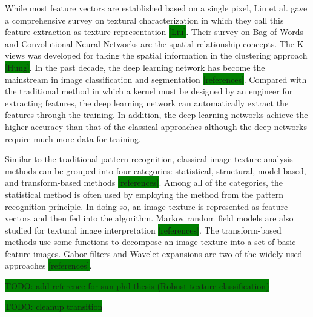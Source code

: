 \documentclass{aci}
\numberwithin{equation}{section}
\begin{document}
While most feature vectors are established based on a single pixel, Liu et al.
gave a comprehensive survey on textural characterization in which they call this
feature extraction as texture representation \colorbox{green}{[Liu]}. Their
survey on Bag of Words and Convolutional Neural Networks are the spatial
relationship concepts. The K-views was developed for taking the spatial
information in the clustering approach \colorbox{green}{[Hung]}.  In the past
decade, the deep learning network has become the mainstream in image
classification and segmentation \colorbox{green}{[references]}. Compared with
the traditional method in which a kernel must be designed by an engineer for
extracting features, the deep learning network can automatically extract the
features through the training. In addition, the deep learning networks achieve
the higher accuracy than that of the classical approaches although the deep
networks require much more data for training.

Similar to the traditional pattern recognition, classical image texture analysis
methods can be grouped into four categories: statistical, structural,
model-based, and transform-based methods \colorbox{green}{[references]}. Among
all of the categories, the statistical method is often used by employing the
method from the pattern recognition principle.  In doing so, an image texture is
represented as feature vectors and then fed into the algorithm. Markov random
field models are also studied for textural image interpretation
\colorbox{green}{[references]}. The transform-based methods use some functions
to decompose an image texture into a set of basic feature images. Gabor filters
and Wavelet expansions are two of the widely used approaches
\colorbox{green}{[references]}.

\colorbox{green}{TODO: add reference for sun phd thesis (Robust texture classification)}

\colorbox{green}{TODO: cleanup transition}
\end{document}
